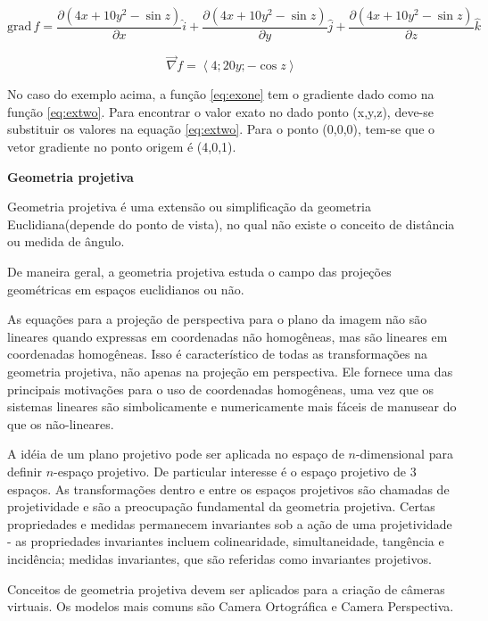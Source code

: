 \documentclass[a4paper]{sbgames}               %
\begin{document}
\begin{equation}
\mbox{grad} \, f = \frac{\partial (4x + 10y^2 - \sin z)}{\partial x} \hat i + \frac{\partial (4x + 10y^2 - \sin z)}{\partial y} \hat j + \frac{\partial (4x + 10y^2 - \sin z)}{\partial z} \hat k
\end{equation}

\begin{equation}
\vec \nabla f = \left\langle 4; 20y ; - \cos z \right\rangle
\label{eq:extwo}
\end{equation}

No caso do exemplo acima, a função \ref{eq:exone} tem o gradiente dado como na função \ref{eq:extwo}. Para encontrar o valor exato no dado ponto (x,y,z), deve-se substituir os valores na equação \ref{eq:extwo}. Para o ponto (0,0,0), tem-se que o vetor gradiente no ponto origem é (4,0,1).

\pagebreak

\textbf{Geometria projetiva} \cite{auffinger2003introduccao}

Geometria projetiva é uma extensão ou simplificação da geometria Euclidiana(depende do ponto de vista), no qual não existe o conceito de distância ou medida de ângulo. 

De maneira geral, a geometria projetiva estuda o campo das projeções geométricas em espaços euclidianos ou não.

As equações para a projeção de perspectiva para o plano da imagem não são lineares quando expressas em coordenadas não homogêneas, mas são lineares em coordenadas homogêneas. Isso é característico de todas as transformações na geometria projetiva, não apenas na projeção em perspectiva. Ele fornece uma das principais motivações para o uso de coordenadas homogêneas, uma vez que os sistemas lineares são simbolicamente e numericamente mais fáceis de manusear do que os não-lineares.

A idéia de um plano projetivo pode ser aplicada no espaço de $n$-dimensional para definir $n$-espaço projetivo. De particular interesse é o espaço projetivo de 3 espaços. As transformações dentro e entre os espaços projetivos são chamadas de projetividade e são a preocupação fundamental da geometria projetiva. Certas propriedades e medidas permanecem invariantes sob a ação de uma projetividade - as propriedades invariantes incluem colinearidade, simultaneidade, tangência e incidência; medidas invariantes, que são referidas como invariantes projetivos.

Conceitos de geometria projetiva devem ser aplicados para a criação de câmeras virtuais. Os modelos mais comuns são Camera Ortográfica e Camera Perspectiva.
\end{document}
